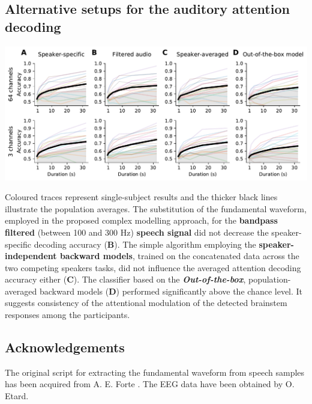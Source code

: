 \documentclass[a0,landscape]{a0poster}
\newenvironment{Figure}
  {\par\medskip\noindent\minipage{\linewidth}}
  {\endminipage\par\medskip}
\begin{document}
\begin{multicols*}{3}
\subsection*{Alternative setups for the auditory attention decoding}
\begin{Figure}
\centering
\includegraphics[width=\linewidth,keepaspectratio]{Figure_6.pdf}
\end{Figure}
\begin{flushleft}
Coloured traces represent single-subject results and the thicker black lines illustrate the population averages. The substitution of the fundamental waveform, employed in the proposed complex modelling approach, for the \textbf{bandpass filtered} (between 100 and 300 Hz) \textbf{speech signal} did not decrease the speaker-specific decoding accuracy (\textbf{B}). The simple algorithm employing the \textbf{speaker-independent backward models}, trained on the concatenated data across the two competing speakers tasks, did not influence the averaged attention decoding accuracy either (\textbf{C}). The classifier based on the \textbf{\textit{Out-of-the-box}}, population-averaged backward models (\textbf{D}) performed significantly above the chance level. It suggests consistency of the attentional modulation of the detected brainstem responses among the participants.
\end{flushleft}


\small
\subsection*{Acknowledgements}
\begin{flushleft}
The original script for extracting the fundamental waveform from speech samples has been acquired from A. E. Forte \cite{Forte2017b}. The EEG data have been obtained by O. Etard.
\end{flushleft}


\end{multicols*}
\end{document}
